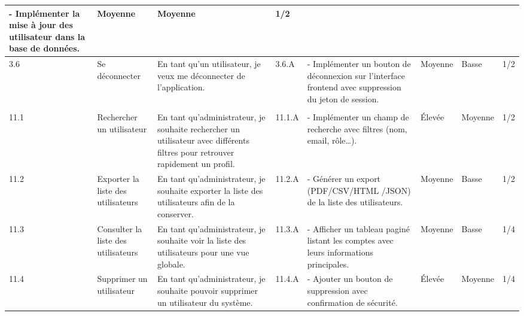 \begin{landscape}
\begin{spacing}{0.94}
\begin{longtable}{|p{0.7cm}|p{2.4cm}|p{6cm}|p{1cm}|p{7.2cm}|p{0.2cm}|p{0.2cm}|p{2cm}|}
                - Implémenter la mise à jour des utilisateur dans la base de données. 
                & Moyenne & Moyenne & 1/2 \\\hline
              3.6 & Se déconnecter 
                & En tant qu’un utilisateur, je veux me déconnecter de l’application.
                & 3.6.A
                &
                - Implémenter un bouton de déconnexion sur l’interface frontend avec suppression du jeton de session. 
                & Moyenne & Basse & 1/2 \\  \hline
            \hline     
            \hline  
            \rowcolor{blue!20}
			\multicolumn{8}{|c|}{\textbf{EPIC 11: Gestion des utilisateurs}} \\\hline
            11.1 & Rechercher un utilisateur 
            & En tant qu’administrateur, je souhaite rechercher un utilisateur avec différents filtres pour retrouver rapidement un profil. 
            & 11.1.A 
            & - Implémenter un champ de recherche avec filtres (nom, email, rôle…). 
            & Élevée & Moyenne & 1/2 \\\hline
            
            11.2 & Exporter la liste des utilisateurs 
            & En tant qu’administrateur, je souhaite exporter la liste des utilisateurs afin de la conserver.
            & 11.2.A 
            & - Générer un export (PDF/CSV/HTML /JSON) de la liste des utilisateurs. 
            & Moyenne & Basse & 1/2 \\\hline
            
            11.3 & Consulter la liste des utilisateurs 
            & En tant qu’administrateur, je souhaite voir la liste des utilisateurs pour une vue globale. 
            & 11.3.A 
            & - Afficher un tableau paginé listant les comptes avec leurs informations principales. 
            & Moyenne & Basse & 1/4 \\\hline
            11.4 & Supprimer un utilisateur 
            & En tant qu’administrateur, je souhaite pouvoir supprimer un utilisateur du système. 
            & 11.4.A 
            & - Ajouter un bouton de suppression avec confirmation de sécurité. 
            & Élevée & Moyenne & 1/4 \\\hline
            

\end{longtable}
\end{spacing}
\end{landscape}
